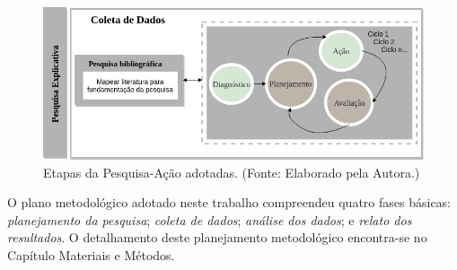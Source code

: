         \begin{figure}[H]
          \centering
          \includegraphics[width=12cm]{figuras/etapasPesquisaAcaoAdotadas.png}
          \caption{Etapas da Pesquisa-Ação adotadas. (Fonte: Elaborado pela Autora.)} 
          \label{fig:etapasPesquisaAcaoAdotas}
        
        \end{figure}

O plano metodológico adotado neste trabalho compreendeu quatro fases básicas: \textit{planejamento da pesquisa}; \textit{coleta de dados}; \textit{análise dos dados}; e \textit{relato dos resultados}. O detalhamento deste planejamento metodológico encontra-se no Capítulo Materiais e Métodos.


